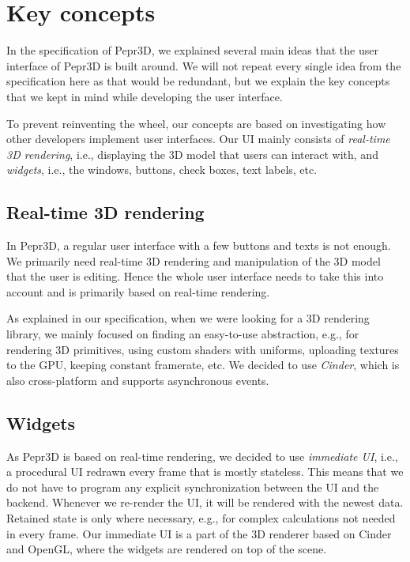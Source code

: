\section{Key concepts}

In the specification of Pepr3D, we explained several main ideas that the user interface of Pepr3D is built around.
We will not repeat every single idea from the specification here as that would be redundant, but we explain the key concepts that we kept in mind while developing the user interface.

To prevent reinventing the wheel, our concepts are based on investigating how other developers implement user interfaces.
Our UI mainly consists of \emph{real-time 3D rendering}, i.e., displaying the 3D model that users can interact with, and \emph{widgets}, i.e., the windows, buttons, check boxes, text labels, etc.

\subsection{Real-time 3D rendering}

In Pepr3D, a regular user interface with a few buttons and texts is not enough.
We primarily need real-time 3D rendering and manipulation of the 3D model that the user is editing.
Hence the whole user interface needs to take this into account and is primarily based on real-time rendering.

As explained in our specification, when we were looking for a 3D rendering library, we mainly focused on finding an easy-to-use abstraction, e.g., for rendering 3D primitives, using custom shaders with uniforms, uploading textures to the GPU, keeping constant framerate, etc.
We decided to use \emph{Cinder}, which is also cross-platform and supports asynchronous events.

\subsection{Widgets}

\label{subsec:imgui}

As Pepr3D is based on real-time rendering, we decided to use \emph{immediate UI}, i.e., a procedural UI redrawn every frame that is mostly stateless.
This means that we do not have to program any explicit synchronization between the UI and the backend.
Whenever we re-render the UI, it will be rendered with the newest data.
Retained state is only where necessary, e.g., for complex calculations not needed in every frame.
Our immediate UI is a part of the 3D renderer based on Cinder and OpenGL, where the widgets are rendered on top of the scene.

